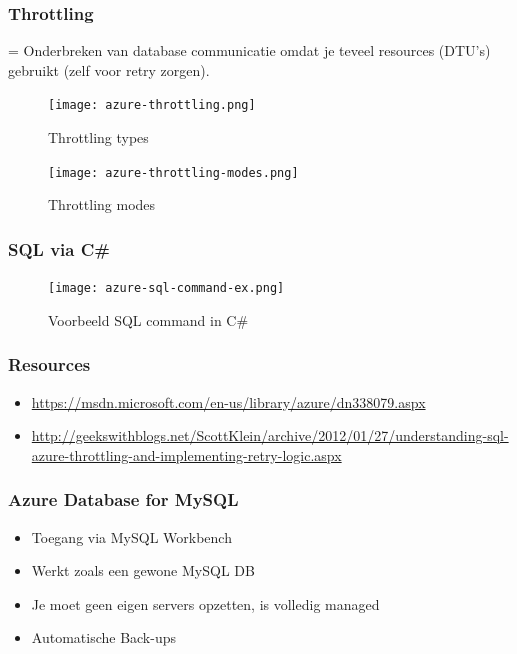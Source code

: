 \documentclass{article}
\begin{document}
\subsubsection{Throttling}
= Onderbreken van database communicatie omdat je teveel resources (DTU's) gebruikt (zelf voor retry zorgen).

\begin{figure}[H]
    \centering
    \texttt{[image: azure-throttling.png]}
    \caption{Throttling types}
\end{figure}

\begin{figure}[H]
    \centering
    \texttt{[image: azure-throttling-modes.png]}
    \caption{Throttling modes}
\end{figure}

\subsubsection{SQL via C\#}

\begin{figure}[H]
    \centering
    \texttt{[image: azure-sql-command-ex.png]}
    \caption{Voorbeeld SQL command in C\#}
\end{figure}


\subsubsection{Resources}
\begin{itemize}
    \item \url{https://msdn.microsoft.com/en-us/library/azure/dn338079.aspx}
    \item \url{http://geekswithblogs.net/ScottKlein/archive/2012/01/27/understanding-sql-azure-throttling-and-implementing-retry-logic.aspx}
\end{itemize}

\subsubsection{Azure Database for MySQL}

\begin{itemize}
    \item Toegang via MySQL Workbench
    \item Werkt zoals een gewone MySQL DB
    \item Je moet geen eigen servers opzetten, is volledig managed
    \item Automatische Back-ups
\end{itemize}
\end{document}
